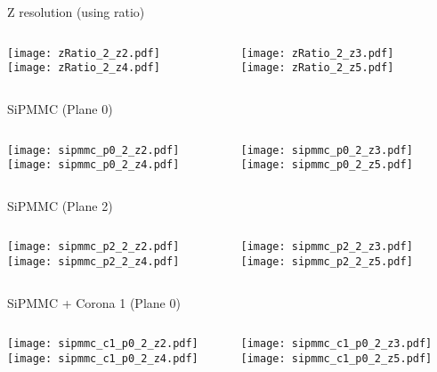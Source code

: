 \documentclass{beamer}
\begin{document}
\begin{frame}{Z resolution (using ratio)}
	\begin{columns}[onlytextwidth]
		\begin{column}{0.5\textwidth}
			\texttt{[image: zRatio\_2\_z2.pdf]} \\
			\texttt{[image: zRatio\_2\_z4.pdf]}
		 \end{column}
		 \begin{column}{0.5\textwidth}
			\texttt{[image: zRatio\_2\_z3.pdf]} \\
			\texttt{[image: zRatio\_2\_z5.pdf]}
		 \end{column}
 \end{columns}
\end{frame}

\begin{frame}{SiPMMC (Plane 0)}
	\begin{columns}[onlytextwidth]
		\begin{column}{0.5\textwidth}
			\texttt{[image: sipmmc\_p0\_2\_z2.pdf]} \\
			\texttt{[image: sipmmc\_p0\_2\_z4.pdf]}
		 \end{column}
		 \begin{column}{0.5\textwidth}
			\texttt{[image: sipmmc\_p0\_2\_z3.pdf]} \\
			\texttt{[image: sipmmc\_p0\_2\_z5.pdf]}
		 \end{column}
 \end{columns}
\end{frame}

\begin{frame}{SiPMMC (Plane 2)}
	\begin{columns}[onlytextwidth]
		\begin{column}{0.5\textwidth}
			\texttt{[image: sipmmc\_p2\_2\_z2.pdf]} \\
			\texttt{[image: sipmmc\_p2\_2\_z4.pdf]}
		 \end{column}
		 \begin{column}{0.5\textwidth}
			\texttt{[image: sipmmc\_p2\_2\_z3.pdf]} \\
			\texttt{[image: sipmmc\_p2\_2\_z5.pdf]}
		 \end{column}
 \end{columns}
\end{frame}

\begin{frame}{SiPMMC + Corona 1 (Plane 0)}
	\begin{columns}[onlytextwidth]
		\begin{column}{0.5\textwidth}
			\texttt{[image: sipmmc\_c1\_p0\_2\_z2.pdf]} \\
			\texttt{[image: sipmmc\_c1\_p0\_2\_z4.pdf]}
		 \end{column}
		 \begin{column}{0.5\textwidth}
			\texttt{[image: sipmmc\_c1\_p0\_2\_z3.pdf]} \\
			\texttt{[image: sipmmc\_c1\_p0\_2\_z5.pdf]}
		 \end{column}
 \end{columns}
\end{frame}
\end{document}
